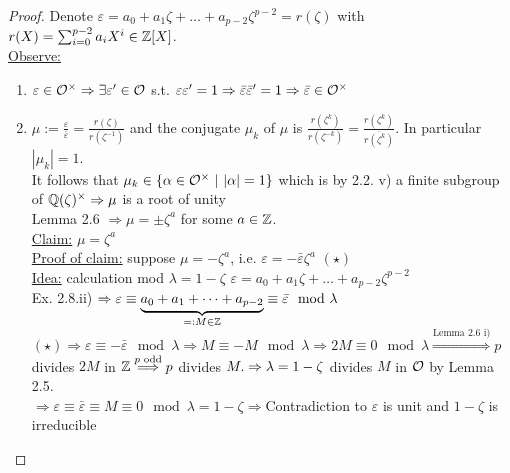 \begin{proof}
Denote $\varepsilon = a_0 + a_1 \zeta + \dots + a_{p-2}\zeta^{p-2} = r(\zeta)$ with $r(X)=\sum_{i=0}^{p-2} a_iX^i \in \mathbb{Z}[X]$.\\
\underline{Observe:}
\begin{enumerate}
\item $\varepsilon \in \mathcal{O}^\times \Rightarrow \exists \varepsilon' \in \mathcal{O} $ s.t. $ \varepsilon \varepsilon' = 1 \Rightarrow \bar{\varepsilon} \bar{\varepsilon}'=1 \Rightarrow \bar{\varepsilon} \in \mathcal{O}^\times$
\item $\mu := \frac{\varepsilon}{\bar{\varepsilon}}=\frac{r(\zeta)}{r(\zeta^{-1})}$ and the conjugate $\mu_k$ of $\mu$ is $\frac{r(\zeta^k)}{r(\zeta^{-k})}=\frac{r(\zeta^k)}{\overline{r(\zeta^{k})}}$. In particular $|\mu_k|=1$.\\
It follows that $\mu_k \in \{\alpha \in \mathcal{O}^\times \ | \ |\alpha|=1\}$ which is by 2.2. v) a finite subgroup of $\mathbb{Q}(\zeta)^\times \Rightarrow \mu $ is a root of unity\\
Lemma 2.6 $\Rightarrow \mu = \pm \zeta^a$ for some $a \in \mathbb{Z}$.\\
\underline{Claim:} $\mu= \zeta^a$\\
\underline{Proof of claim:} suppose $\mu = -\zeta^a$, i.e. $\varepsilon=-\bar{\varepsilon}\zeta^a$ \quad $(\star )$\\
\underline{Idea:} calculation mod $\lambda=1-\zeta$ \quad $\varepsilon = a_0+a_1\zeta+\dots+a_{p-2}\zeta^{p-2}$\\
Ex. 2.8.ii) $\Rightarrow \varepsilon \equiv \underbrace{a_0 + a_1+ \dots + a_{p-2}}_{ =: M \in \mathbb{Z}} \equiv \bar{\varepsilon} \mod \lambda$\\
$(\star) \Rightarrow \varepsilon \equiv -\bar{\varepsilon} \mod \lambda \Rightarrow M\equiv -M \mod \lambda \Rightarrow 2M \equiv 0 \mod \lambda \stackrel{\text{Lemma 2.6 i)}}{\Longrightarrow} p$ divides $2M$ in $\mathbb{Z} \stackrel{{p \text{ odd}}}{\Longrightarrow} p$ divides $M.\\
\Rightarrow \lambda = 1-\zeta$ divides $M$ in $\mathcal{O}$ by Lemma 2.5.\\
$\Rightarrow \varepsilon \equiv \bar{\varepsilon} \equiv M \equiv 0 \mod \lambda=1-\zeta \Rightarrow $Contradiction to $\varepsilon$ is unit and $1- \zeta$ is irreducible
\end{enumerate}
\end{proof}


